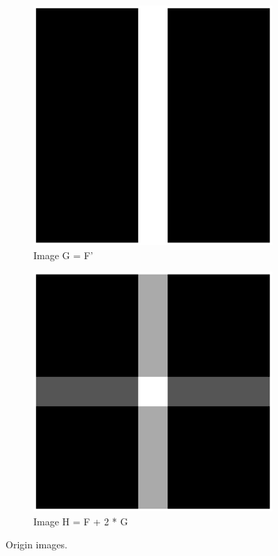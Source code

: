\documentclass[11pt,a4paper]{article}
\begin{document}
\begin{figure}[!ht]
\begin{subfigure}[t]{.32\linewidth}
	\includegraphics[width=\columnwidth]{Linearity_G.eps}
	\caption{Image G = F'}
	\label{fig:G}
	\end{subfigure}
	\begin{subfigure}[t]{.32\linewidth} %
	\includegraphics[width=\columnwidth]{Linearity_H.eps}
	\caption{Image H = F + 2 * G}
	\label{fig:H}
	\end{subfigure}
	\caption{Origin images.}
	\label{fig:origin}
\end{figure}
\end{document}
